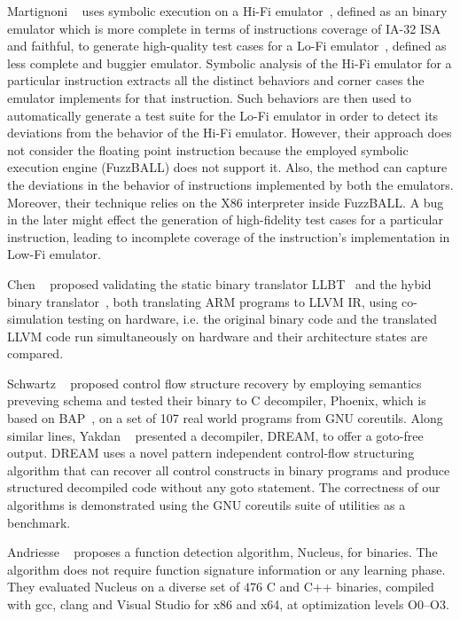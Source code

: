 Martignoni \etal~\cite{Martignoni:ASPLOS2012} uses symbolic execution on a Hi-Fi emulator~\cite{Bochs1996}, defined as an binary emulator which is more complete in terms of instructions coverage of IA-32 ISA and faithful, to generate high-quality test cases for a Lo-Fi emulator~\cite{QEMU:USENIX05}, defined as  less complete and buggier emulator. Symbolic analysis of the Hi-Fi emulator for a particular instruction extracts all the distinct behaviors and corner cases the emulator implements for that instruction. Such behaviors are then used to automatically generate  a test suite for the Lo-Fi emulator in order to  detect its deviations from the behavior of the Hi-Fi emulator. However, their approach does not consider the floating point instruction because the employed symbolic execution engine (FuzzBALL) does not support it. Also, the method can capture the deviations in the behavior of instructions implemented by both the emulators. Moreover, their technique relies on the X86 interpreter inside FuzzBALL. A bug in the later might effect the generation of high-fidelity test cases for a particular instruction, leading to incomplete coverage of the instruction's implementation in Low-Fi emulator.

Chen \etal~\cite{CLSS2015} proposed validating the static binary translator
LLBT~\cite{LLBT2012} and the hybid binary translator~\cite{LLVMDBT2012}, both
translating ARM programs to LLVM IR,  using co-simulation testing on hardware,
            i.e. the original binary code and the translated LLVM  code run
            simultaneously on hardware and their architecture states are
            compared.

Schwartz \etal~\cite{Schwartz:2013} proposed control flow structure recovery by employing semantics preveving schema and tested their binary to C decompiler, Phoenix, which is based on BAP~\cite{BAP:CAV11}, on a set of 107 real world programs from GNU coreutils. Along similar lines, 
%
Yakdan \etal~\cite{Yakdan2015NDSS} presented a decompiler, DREAM, to offer a goto-free output. DREAM uses a novel pattern independent control-flow structuring algorithm that can recover all control constructs in binary programs and produce structured decompiled code without any goto statement. The correctness of our algorithms is demonstrated using the GNU coreutils suite of utilities as a benchmark.

Andriesse \etal~\cite{nucleus2017EuroSP} proposes a function detection algorithm, Nucleus, for binaries. The algorithm does not require function signature information or any learning phase. They evaluated Nucleus on a diverse set of $476$ C and C++ binaries, compiled with gcc, clang and Visual Studio for x86 and x64, at optimization levels O0--O3. 
  
